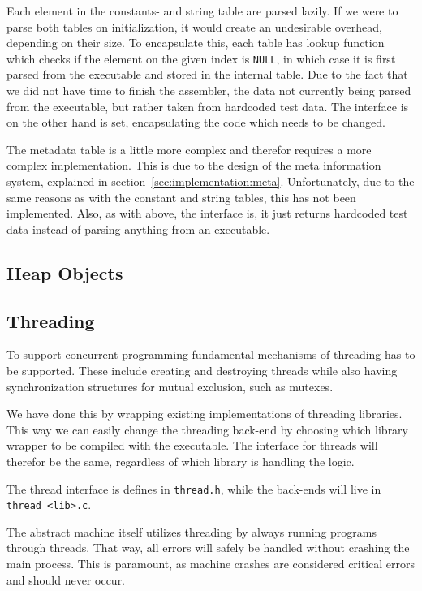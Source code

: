 Each element in the constants- and string table are parsed lazily. If we were to
parse both tables on initialization, it would create an undesirable overhead,
depending on their size. To encapsulate this, each table has lookup function
which checks if the element on the given index is {\tt NULL}, in which case it
is first parsed from the executable and stored in the internal table. Due to the
fact that we did not have time to finish the assembler, the data not currently
being parsed from the executable, but rather taken from hardcoded test data. The
interface is on the other hand is set, encapsulating the code which needs to be
changed.

The metadata table is a little more complex and therefor requires a more complex
implementation. This is due to the design of the meta information system,
explained in section~\ref{sec:implementation:meta}. Unfortunately, due to the
same reasons as with the constant and string tables, this has not been
implemented. Also, as with above, the interface is, it just returns hardcoded
test data instead of parsing anything from an executable.


\subsection{Heap Objects}


\subsection{Threading}

To support concurrent programming fundamental mechanisms of threading has to be
supported. These include creating and destroying threads while also having
synchronization structures for mutual exclusion, such as mutexes.

We have done this by wrapping existing implementations of threading libraries.
This way we can easily change the threading back-end by choosing which library
wrapper to be compiled with the executable. The interface for threads will
therefor be the same, regardless of which library is handling the logic.

The thread interface is defines in {\tt thread.h}, while the back-ends will live
in {\tt thread\_<lib>.c}.

The abstract machine itself utilizes threading by always running programs
through threads. That way, all errors will safely be handled without crashing
the main process. This is paramount, as machine crashes are considered critical
errors and should never occur.

